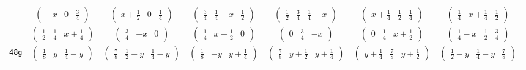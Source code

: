 \documentclass[fleqn,9pt,landscape]{jsarticle}
\begin{document}
\begin{center}
\begin{longtable}{ccccccc}
& $ \begin{pmatrix} - x & 0 & \frac{3}{4} \end{pmatrix} $ & $ \begin{pmatrix} x + \frac{1}{2} & 0 & \frac{1}{4} \end{pmatrix} $ & $ \begin{pmatrix} \frac{3}{4} & \frac{1}{4} - x & \frac{1}{2} \end{pmatrix} $ & $ \begin{pmatrix} \frac{1}{2} & \frac{3}{4} & \frac{1}{4} - x \end{pmatrix} $ & $ \begin{pmatrix} x + \frac{1}{4} & \frac{1}{2} & \frac{1}{4} \end{pmatrix} $ & $ \begin{pmatrix} \frac{1}{4} & x + \frac{1}{4} & \frac{1}{2} \end{pmatrix} $ \\
& $ \begin{pmatrix} \frac{1}{2} & \frac{1}{4} & x + \frac{1}{4} \end{pmatrix} $ & $ \begin{pmatrix} \frac{3}{4} & - x & 0 \end{pmatrix} $ & $ \begin{pmatrix} \frac{1}{4} & x + \frac{1}{2} & 0 \end{pmatrix} $ & $ \begin{pmatrix} 0 & \frac{3}{4} & - x \end{pmatrix} $ & $ \begin{pmatrix} 0 & \frac{1}{4} & x + \frac{1}{2} \end{pmatrix} $ & $ \begin{pmatrix} \frac{1}{4} - x & \frac{1}{2} & \frac{3}{4} \end{pmatrix} $ \\ \hline
{\tt 48g} & $ \begin{pmatrix} \frac{1}{8} & y & \frac{1}{4} - y \end{pmatrix} $ & $ \begin{pmatrix} \frac{7}{8} & \frac{1}{2} - y & \frac{1}{4} - y \end{pmatrix} $ & $ \begin{pmatrix} \frac{1}{8} & - y & y + \frac{1}{4} \end{pmatrix} $ & $ \begin{pmatrix} \frac{7}{8} & y + \frac{1}{2} & y + \frac{1}{4} \end{pmatrix} $ & $ \begin{pmatrix} y + \frac{1}{4} & \frac{7}{8} & y + \frac{1}{2} \end{pmatrix} $ & $ \begin{pmatrix} \frac{1}{2} - y & \frac{1}{4} - y & \frac{7}{8} \end{pmatrix} $ \\

\end{longtable}
\end{center}
\end{document}

